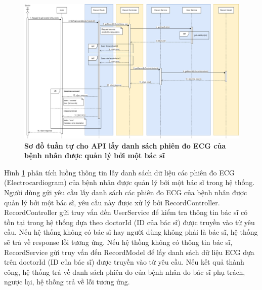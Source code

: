  \begin{figure}[H]
  \centering
  \includegraphics[scale=0.3]{Images/sequence_api/getRecordsByDoctor.png}
  \caption[Sơ đồ tuần tự cho API lấy danh sách phiên đo ECG của bệnh nhân được quản lý bởi một bác sĩ ]{\bfseries \fontsize{12pt}{0pt}
  \selectfont Sơ đồ tuần tự cho API lấy danh sách phiên đo ECG của bệnh nhân được quản lý bởi một bác sĩ}
  \label{api_getRecordsByDoctor} %
\end{figure}
Hình \ref{api_getRecordsByDoctor} phân tích luồng thông tin lấy danh sách dữ liệu các phiên đo ECG (Electrocardiogram) của bệnh nhân được quản lý bởi một bác sĩ trong hệ thống. Người dùng gửi yêu cầu lấy danh sách các phiên đo ECG của bệnh nhân được quản lý bởi một bác sĩ, 
yêu cầu này được xử lý bởi RecordController. RecordController gửi truy vấn đến UserService để kiểm tra thông tin bác sĩ có tồn tại trong hệ thống dựa theo doctorId (ID của bác sĩ) được truyền vào từ yêu cầu. Nếu hệ thống không có bác sĩ hay người dùng không phải là bác sĩ, hệ thống sẽ
trả về response lỗi tương ứng. Nếu hệ thồng không có thông tin bác sĩ, RecordService gửi truy vấn đến RecordModel để lấy danh sách dữ liệu ECG dựa trên doctorId (ID của bác sĩ) được truyền vào từ yêu cầu. 
Nếu kết quả thành công, hệ thống trả về danh sách phiên đo của bệnh nhân do bác sĩ phụ trách, ngược lại, hệ thống trả về lỗi tương ứng.

